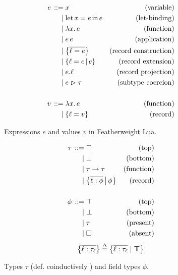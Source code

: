 \begin{subfigure}{.49\textwidth}
\begin{align*}
    \graintro e
    x 
    & \text{(variable)}
    \graitem
    \fllet{x}{e}e
    & \text{(let-binding)}
    \graitem
    \fllam{x} e
    & \text{(function)}
    \graitem
    e\,e
    & \text{(application)}        
    \graitem
    \flrec{\overline{\ell = e}}
    & \text{(record construction)}
    \graitem
    \flext{\ell = e}{e}
    & \text{(record extension)}
    \graitem
    \flproj{e}{\ell}
    & \text{(record projection)}
    \graitem
    \flcast{e}{\tau}
    & \text{(subtype coercion)}
    \\ \\
    \graintro v
    \fllam{x} e
    & \text{(function)}
    \graitem
    \flrec{\ell = v}
    & \text{(record)}
\end{align*}
\caption{Expressions $e$ and values $v$ in Featherweight Lua.}
\label{fig:featherweight-lua-expr}
\end{subfigure}
\hfill
\begin{subfigure}{.49\textwidth}
\begin{align*}
    \graintro \tau
    \top
    & \text{(top)}
    \graitem
    \bot
    & \text{(bottom)}
    \graitem
    \tau \to \tau
    & \text{(function)}
    \graitem
    \flext{\overline{\ell : \phi}}{\phi}
    & \text{(record)}
    \\ \\ 
    \graintro \phi 
    \flftop
    & \text{(top)}
    \graitem
    \flfbot 
    & \text{(bottom)}
    \graitem
    \tau
    & \text{(present)}
    \graitem
    \flabsent 
    & \text{(absent)}
\end{align*}
$$ \flrec{ \overline{\ell : \tau_\ell} } \defeq \flrec{ \overline{\ell : \tau_\ell} \mid \flftop } $$
\caption{Types $\tau$ (def. coinductively \cite{castagna-polymorphic-variants}) and field types $\phi$.}
\label{fig:featherweight-lua-types}
\end{subfigure}
